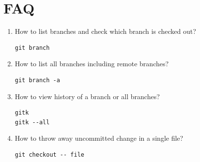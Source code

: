 \documentclass[a4paper,10pt]{article}
\begin{document}
\section{FAQ}
\begin{enumerate}
  \item How to list branches and check which branch is checked out?
    \begin{lstlisting}
git branch
    \end{lstlisting}
  \item How to list all branches including remote branches?
    \begin{lstlisting}
git branch -a
    \end{lstlisting}
  \item How to view history of a branch or all branches?
    \begin{lstlisting}
gitk
gitk --all
    \end{lstlisting}
  \item How to throw away uncommitted change in a single file?
    \begin{lstlisting}
git checkout -- file
    \end{lstlisting}

\end{enumerate}
\end{document}

